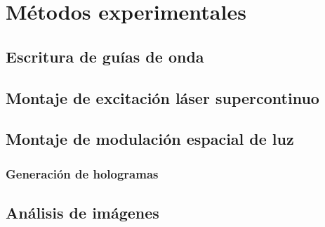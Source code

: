 \chapter{Métodos experimentales}

\section{Escritura de guías de onda}

\section{Montaje de excitación láser supercontinuo}

\section{Montaje de modulación espacial de luz}
\subsection{Generación de hologramas}
\section{Análisis de imágenes}

